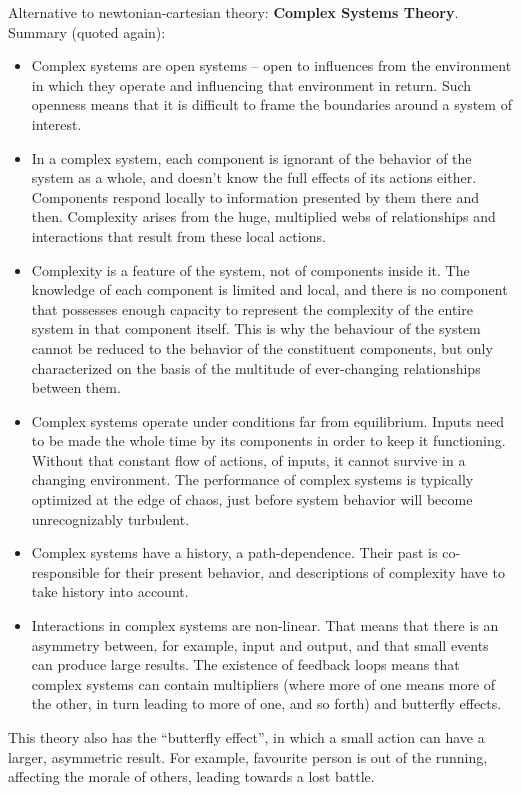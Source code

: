 Alternative to newtonian-cartesian theory: \textbf{Complex Systems Theory}.
Summary (quoted again):
\begin{itemize}
\item Complex systems are open systems -- open to influences from the environment in which they operate and influencing that environment in return. 
Such openness means that it is difficult to frame the boundaries around a system of interest.
\item In a complex system, each component is ignorant of the behavior of the system as a whole, and doesn’t know the full effects of its actions either. 
Components respond locally to information presented by them there and then. 
Complexity arises from the huge, multiplied webs of relationships and interactions that result from these local actions.
\item Complexity is a feature of the system, not of components inside it.
The knowledge of each component is limited and local, and there is no component that possesses enough capacity to represent the complexity of the entire system in that component itself. 
This is why the behaviour of the system cannot be reduced to the behavior of the constituent components, but only characterized on the basis of the multitude of ever-changing relationships between them.
\item Complex systems operate under conditions far from equilibrium. Inputs
need to be made the whole time by its components in order to keep it
functioning. Without that constant flow of actions, of inputs, it cannot
survive in a changing environment. The performance of complex systems
is typically optimized at the edge of chaos, just before system behavior
will become unrecognizably turbulent.
\item Complex systems have a history, a path-dependence. 
Their past is co-responsible for their present behavior, and descriptions of complexity have to take history into account.
\item Interactions in complex systems are non-linear. 
That means that there is an asymmetry between, for example, input and output, and that small events can produce large results. 
The existence of feedback loops means that complex systems can contain multipliers (where more of one means more of the other, in turn leading to more of one, and so forth) and butterfly effects.
\end{itemize}

This theory also has the ``butterfly effect'', in which a small action can have a larger, asymmetric result.
For example, favourite person is out of the running, affecting the morale of others, leading towards a lost battle.

